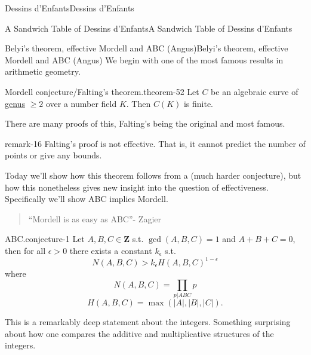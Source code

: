 \documentclass[10pt,]{book}
\numberwithin{equation}{section}
\newcommand{\ZZ}{\mathbf{Z}}
\newcommand{\gt}{>}
\begin{document}
\begin{chapterptx}{Dessins d'Enfants}{}{Dessins d'Enfants}{}{}
\begin{sectionptx}{A Sandwich Table of Dessins d'Enfants}{}{A Sandwich Table of Dessins d'Enfants}{}{}
\end{sectionptx}
%
%
\typeout{************************************************}
\typeout{************************************************}
%
\begin{sectionptx}{Belyi's theorem, effective Mordell and ABC (Angus)}{}{Belyi's theorem, effective Mordell and ABC (Angus)}{}{}\label{sec-beyi-abc}
\hypertarget{p-665}{}%
We begin with one of the most famous results in arithmetic geometry.%
\begin{theorem}{Mordell conjecture/Falting's theorem.}{}{theorem-52}%
\hypertarget{p-666}{}%
Let \(C\) be an algebraic curve of \hyperref[def-class-set]{genus} \(\ge 2\) over a number field \(K\). Then \(C(K)\) is finite.%
\end{theorem}
\hypertarget{p-667}{}%
There are many proofs of this, Falting's being the original and most famous.%
\begin{remark}{}{remark-16}%
\hypertarget{p-668}{}%
Falting's proof is not effective. That is, it cannot predict the number of points or give any bounds.%
\end{remark}
\hypertarget{p-669}{}%
Today we'll show how this theorem follows from a (much harder conjecture), but how this nonetheless gives new insight into the question of effectiveness. Specifically we'll show ABC implies Mordell.%
\begin{quote}\hypertarget{blockquote-1}{}
\hypertarget{p-670}{}%
``Mordell is as easy as ABC''- Zagier%
\end{quote}
\begin{conjecture}{ABC.}{}{conjecture-1}%
\hypertarget{p-671}{}%
Let \(A,B,C\in \ZZ\) s.t. \(\gcd(A,B,C)  =1 \) and \(A+B+C=0\), then for all \(\epsilon \gt 0\) there exists a constant \(k_\epsilon\) s.t.%
\begin{equation*}
N(A,B,C) \gt k_\epsilon H(A,B,C)^{1-\epsilon}
\end{equation*}
where%
\begin{equation*}
N(A,B,C) =  \prod_{p|ABC} p
\end{equation*}
%
\begin{equation*}
H(A,B,C) = \max(|A|,|B|,|C|)\text{.}
\end{equation*}
%
\end{conjecture}
\hypertarget{p-672}{}%
This is a remarkably deep statement about the integers. Something surprising about how one compares the additive and multiplicative structures of the integers.%
\par

\end{sectionptx}
\end{chapterptx}
\end{document}
